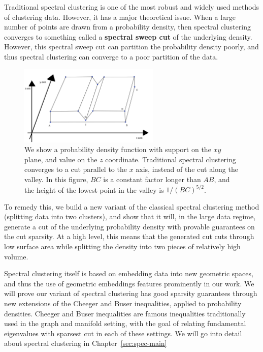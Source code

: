 Traditional spectral clustering is one of the most robust and widely
used methods of clustering data. However, it has a major theoretical
issue. When a large number of points are drawn from a probability
density, then spectral clustering converges to something called a
\textbf{spectral sweep cut} of the underlying density.  However, this
spectral sweep cut can partition the probability density poorly, and
thus spectral clustering can converge to a poor partition of the data.

\begin{figure}[htbp]
\centering
\includegraphics[width=0.6\textwidth]{images/counterexample.png}
\caption{
  We show a probability density function with support on the $xy$ plane,
  and value on the $z$ coordinate.  Traditional spectral clustering converges to a cut
  parallel to the $x$ axis, instead of the cut along the valley.
    In this figure,
  $BC$ is a constant
  factor longer than $AB$, and the height of the lowest point in the
  valley is
  $1/(BC)^{5/2}$. 
 }
\label{fig:spec}
\end{figure}

To remedy this, we build a new variant of the classical spectral
clustering method (splitting data into two clusters), and show that it
will, in the large data regime, generate a cut of the underlying probability
density with provable guarantees on the cut sparsity. At a high level,
this means that the generated cut cuts through low surface area while splitting the density into
two pieces of relatively high volume.

Spectral clustering itself is based on embedding data into new geometric
spaces, and thus the use of geometric embeddings features prominently in
our work. We will prove our variant of spectral clustering has good
sparsity guarantees through new extensions of the Cheeger and Buser
inequalities, applied to
probability densities. Cheeger and Buser inequalities are famous
inequalities traditionally used in the graph and manifold setting, with
the goal of relating fundamental eigenvalues with sparsest cut in each
of these settings. We will go into detail about spectral clustering in
Chapter~\ref{sec:spec-main}


